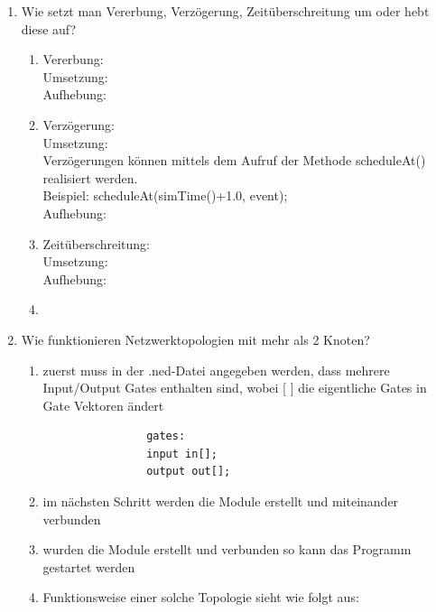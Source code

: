 \documentclass[11pt]{article}
\begin{document}
\begin{enumerate}[\thesubsection .1]
\begin{addmargin}[1em]{1em}
\begin{enumerate}
                \begin{lstlisting}
                    Tictoc.tic.delayTime = exponential(3s)
                    Tictoc.toc.delayTime = truncnormal(3s, 1s)
                \end{lstlisting}
            \end{enumerate}

        \end{addmargin}


        \item Wie setzt man Vererbung, Verzögerung, Zeitüberschreitung um oder hebt diese auf?\\


        \begin{enumerate}
            \item Vererbung:\\
            Umsetzung:\\
            Aufhebung:\\

            \item Verzögerung:\\
            Umsetzung:\\
            Verzögerungen können mittels dem Aufruf der Methode scheduleAt() realisiert werden.\\
            Beispiel: scheduleAt(simTime()+1.0, event);\\
            Aufhebung:\\

            \item Zeitüberschreitung:\\
            Umsetzung:\\
            Aufhebung:\\

            \item{}
        \end{enumerate}

        \item Wie funktionieren Netzwerktopologien mit mehr als 2 Knoten?\\
        \begin{enumerate}
            \item{zuerst muss in der .ned-Datei angegeben werden, dass mehrere Input/Output Gates enthalten sind, wobei [ ]
            die eigentliche Gates in Gate Vektoren ändert}
            \begin{lstlisting}
                gates:
                input in[];
                output out[];
            \end{lstlisting}
            \item{im nächsten Schritt werden die Module erstellt und miteinander verbunden\\}
            \item{wurden die Module erstellt und verbunden so kann das Programm gestartet werden\\}
            \item{Funktionsweise einer solche Topologie sieht wie folgt aus:\\}


\end{enumerate}
\end{enumerate}
\end{document}
